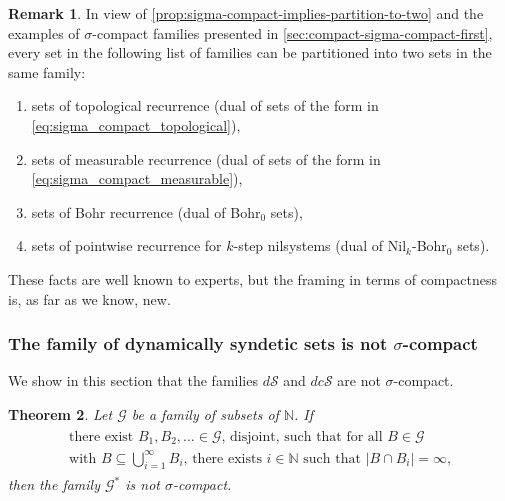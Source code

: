 \documentclass[letter,11pt]{article}
\theoremstyle{plain}
\newtheorem{theorem}{Theorem}
\theoremstyle{definition}
\newtheorem{remark}[theorem]{Remark}
\theoremstyle{plain}
\theoremstyle{plain}
\numberwithin{equation}{section}
\newcommand{\N}{\mathbb{N}}
\newcommand{\dsyndetic}{d\mathcal{S}}
\newcommand{\dcsyndetic}{dc\mathcal{S}}
\newcommand{\classtwo}{\mathscr{G}}
\begin{document}
\begin{remark}
    In view of \cref{prop:sigma-compact-implies-partition-to-two} and the examples of $\sigma$-compact families presented in \cref{sec:compact-sigma-compact-first}, every set in the following list of families can be partitioned into two sets in the same family:
    \begin{enumerate}
        \item sets of topological recurrence (dual of sets of the form in \eqref{eq:sigma_compact_topological}),
        \item sets of measurable recurrence (dual of sets of the form in \eqref{eq:sigma_compact_measurable}), 
        \item sets of Bohr recurrence (dual of Bohr$_0$ sets),
        \item sets of pointwise recurrence for $k$-step nilsystems (dual of Nil$_k$-Bohr$_0$ sets).
    \end{enumerate}
    These facts are well known to experts, but the framing in terms of compactness is, as far as we know, new.
\end{remark}



\subsubsection{The family of dynamically syndetic sets is not \texorpdfstring{$\sigma$}{sigma}-compact}

We show in this section that the families $\dsyndetic$ and $\dcsyndetic$ are not $\sigma$-compact.

\begin{theorem}
\label{thm_suff_condition_for_dual_not_sigma_compact}
    Let $\classtwo$ be a family of subsets of $\N$.  If
    \begin{align}
        \label{eqn_key_property_to_refute_sigma_compactness_one}
        \begin{gathered}
            \text{there exist $B_1, B_2, \ldots \in \classtwo$, disjoint, such that for all $B \in \classtwo$} \\ \text{with $B \subseteq \bigcup_{i=1}^\infty B_i$, there exists $i \in \N$ such that $|B \cap B_i| = \infty$,}
        \end{gathered}
    \end{align}
    then the family $\classtwo^*$ is not $\sigma$-compact.
\end{theorem}
\end{document}
